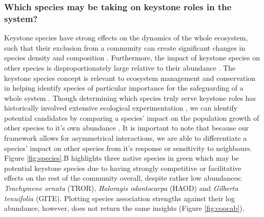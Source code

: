 \documentclass[a4,12pt]{article}
\begin{document}
    \subsubsection*{Which species may be taking on keystone roles in the system?}
    Keystone species have strong effects on the dynamics of the whole ecosystem, such that their exclusion from a community can create significant changes in species density and composition \parencite{Paine1969}. Furthermore, the impact of keystone species on other species is disproportionately large relative to their abundance \parencite{Power1996, Piraino2002, Libralato2006}. The keystone species concept is  relevant to ecosystem management and conservation in helping identify species of particular importance for the safeguarding of a whole system \parencite{Soule2005a}. Though determining which species truly serve keystone roles has historically involved extensive ecological experimentation \parencite{}, we can identify potential candidates by comparing a species' impact on the population growth of other species to it's own abundance \parencite{Libralato2006}. It is important to note that because our framework allows for asymmetrical interactions, we are able to differentiate a species' impact on other species from it's response or sensitivity to neighbours. Figure \ref{fig:species}.B highlights three native species in green which may be potential keystone species due to having strongly competitive or facilitative effects on the rest of the community overall, despite rather low abundances: \textit{Trachymene ornata} (TROR), \textit{Haloragis odontocarpa} (HAOD) and \textit{Gilberta tenuifolia} (GITE). Plotting species association strengths against their log abundance, however, does not return the same insights (Figure \ref{fig:coocab}).
    
\end{document}
